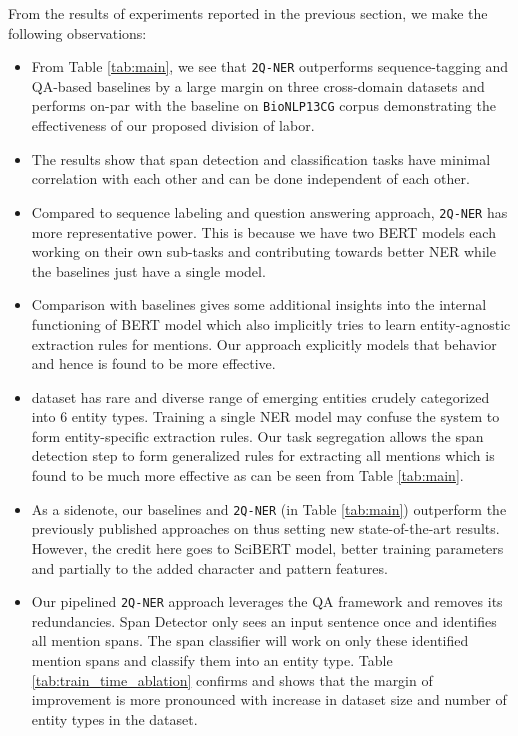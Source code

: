 From the results of experiments reported in the previous section, we make the following observations:

\begin{itemize}
    \item From Table \ref{tab:main}, we see that \texttt{2Q-NER} outperforms sequence-tagging and QA-based baselines by a large margin on three cross-domain datasets and performs on-par with the baseline on \texttt{BioNLP13CG} corpus demonstrating the effectiveness of our proposed division of labor. 
    
    \item The results show that span detection and classification tasks have minimal correlation with each other and can be done independent of each other. 
    
    \item Compared to sequence labeling and question answering approach, \texttt{2Q-NER} has more representative power. This is because we have two BERT models each working on their own sub-tasks and contributing towards better NER while the baselines just have a single model.
    
    \item Comparison with baselines gives some additional insights into the internal functioning of BERT model which also implicitly tries to learn entity-agnostic extraction rules for mentions. Our approach explicitly models that behavior and hence is found to be more effective.
    
    \item {} dataset has rare and diverse range of emerging entities crudely categorized into $6$ entity types. Training a single NER model may confuse the system to form entity-specific extraction rules. Our task segregation allows the span detection step to form generalized rules for extracting all mentions which is found to be much more effective as can be seen from Table \ref{tab:main}.
    
    \item As a sidenote, our baselines and \texttt{2Q-NER} (in Table \ref{tab:main}) outperform the previously published approaches on  thus setting new state-of-the-art results. However, the credit here goes to SciBERT model, better training parameters and partially to the added character and pattern features.
    
    \item Our pipelined \texttt{2Q-NER} approach leverages the QA framework and removes its redundancies. Span Detector only sees an input sentence once and identifies all mention spans. The span classifier will work on only these identified mention spans and classify them into an entity type. Table \ref{tab:train_time_ablation} confirms and shows that the margin of improvement is more pronounced with increase in dataset size and number of entity types in the dataset.
    

\end{itemize}
